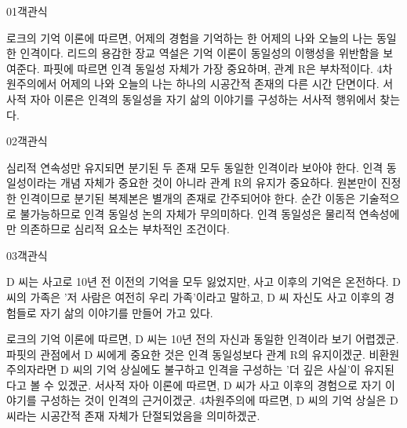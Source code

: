 \documentclass[fs85,seriesWit]{korfarm-base}
\begin{document}
\kfBeginMC
\begin{kfQBlock}{01}{객관식}
\begin{kfChoices}
\kfChoice 로크의 기억 이론에 따르면, 어제의 경험을 기억하는 한 어제의 나와 오늘의 나는 동일한 인격이다.
\kfChoice 리드의 용감한 장교 역설은 기억 이론이 동일성의 이행성을 위반함을 보여준다.
\kfChoice 파핏에 따르면 인격 동일성 자체가 가장 중요하며, 관계 R은 부차적이다.
\kfChoice 4차원주의에서 어제의 나와 오늘의 나는 하나의 시공간적 존재의 다른 시간 단면이다.
\kfChoice 서사적 자아 이론은 인격의 동일성을 자기 삶의 이야기를 구성하는 서사적 행위에서 찾는다.
\end{kfChoices}
\end{kfQBlock}

\begin{kfQBlock}{02}{객관식}
\begin{kfChoices}
\kfChoice 심리적 연속성만 유지되면 분기된 두 존재 모두 동일한 인격이라 보아야 한다.
\kfChoice 인격 동일성이라는 개념 자체가 중요한 것이 아니라 관계 R의 유지가 중요하다.
\kfChoice 원본만이 진정한 인격이므로 분기된 복제본은 별개의 존재로 간주되어야 한다.
\kfChoice 순간 이동은 기술적으로 불가능하므로 인격 동일성 논의 자체가 무의미하다.
\kfChoice 인격 동일성은 물리적 연속성에만 의존하므로 심리적 요소는 부차적인 조건이다.
\end{kfChoices}
\end{kfQBlock}

\begin{kfQBlock}{03}{객관식}
\begin{kfEvidence}D 씨는 사고로 10년 전 이전의 기억을 모두 잃었지만, 사고 이후의 기억은 온전하다. D 씨의 가족은 '저 사람은 여전히 우리 가족'이라고 말하고, D 씨 자신도 사고 이후의 경험들로 자기 삶의 이야기를 만들어 가고 있다.\end{kfEvidence}
\begin{kfChoices}
\kfChoice 로크의 기억 이론에 따르면, D 씨는 10년 전의 자신과 동일한 인격이라 보기 어렵겠군.
\kfChoice 파핏의 관점에서 D 씨에게 중요한 것은 인격 동일성보다 관계 R의 유지이겠군.
\kfChoice 비환원주의자라면 D 씨의 기억 상실에도 불구하고 인격을 구성하는 '더 깊은 사실'이 유지된다고 볼 수 있겠군.
\kfChoice 서사적 자아 이론에 따르면, D 씨가 사고 이후의 경험으로 자기 이야기를 구성하는 것이 인격의 근거이겠군.
\kfChoice 4차원주의에 따르면, D 씨의 기억 상실은 D 씨라는 시공간적 존재 자체가 단절되었음을 의미하겠군.
\end{kfChoices}
\end{kfQBlock}
\end{document}
